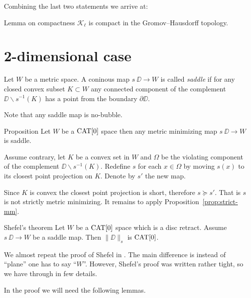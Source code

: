 \documentclass[a4paper,10pt]{amsart}
\begin{document}
Combining the last two statements we arrive at:

\begin{thm}{Lemma on compactness}\label{lem:compact}
$\mathcal{K}_\ell$ is compact in the Gromov--Hausdorff topology.
\end{thm}

\section{2-dimensional case}

Let $W$ be a metric space.
A coninous map $s\:\DD\to W$ is called \emph{saddle} if for any closed convex subset $K\subset W$ 
any connected component of the complement $\DD\backslash s^{-1}(K)$
has a point from the boundary $\partial \DD$.

Note that any saddle map is no-bubble.

\begin{thm}{Proposition}
Let $W$ be a $\mathop{\rm CAT}\nolimits[0]$ space then any metric minimizing map $s\:\DD\to W$ is saddle.
\end{thm}

Assume contrary, let $K$ be a convex set in $W$
and $\Omega$ be the violating component of the complement $\DD\backslash s^{-1}(K)$.
Redefine $s$ for each $x\in\Omega$ by moving 
$s(x)$ to its closest point projection on $K$.
Denote by $s'$ the new map.

Since $K$ is convex the closest point projection is short,
therefore $s\succcurlyeq s'$.
That is $s$ is not strictly metric minimizing.
It remains to apply Proposition~\ref{prop:strict-mm}.
\qeds


\begin{thm}{Shefel's theorem}\label{thm:shefel-2D}
Let $W$ be a $\mathop{\rm CAT}\nolimits[0]$ space which is a disc retract.
Assume $s\:\DD\to W$ be a saddle map. 
Then $\|\DD\|_s$ is $\mathop{\rm CAT}\nolimits[0]$.
\end{thm}

We almost repeat the proof of Shefel in \cite{shefel-2D}.
The main difference is instead of ``plane'' one has to say ``$W$''.
However, Shefel's proof was written rather tight, so we have through in few details.

In the proof we will need the following lemmas.
\end{document}
